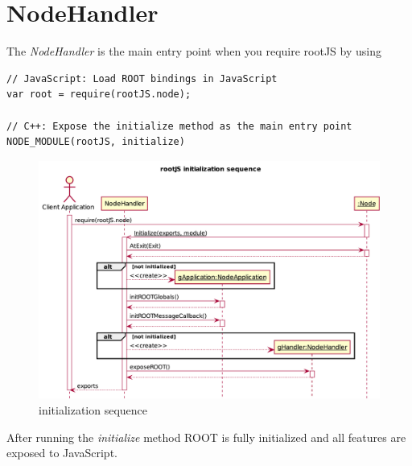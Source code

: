 \chapter{NodeHandler}
The \textit{NodeHandler} is the main entry point when you require rootJS by using
\begin{verbatim}
// JavaScript: Load ROOT bindings in JavaScript
var root = require(rootJS.node);

// C++: Expose the initialize method as the main entry point
NODE_MODULE(rootJS, initialize)
\end{verbatim}
\begin{figure}[H]
	\centering
	\includegraphics[width=18cm]{./latex/resources/initSequence.pdf}
	\caption{initialization sequence}
\end{figure}
After running the \textit{initialize} method ROOT is fully initialized and all features are exposed to JavaScript.
